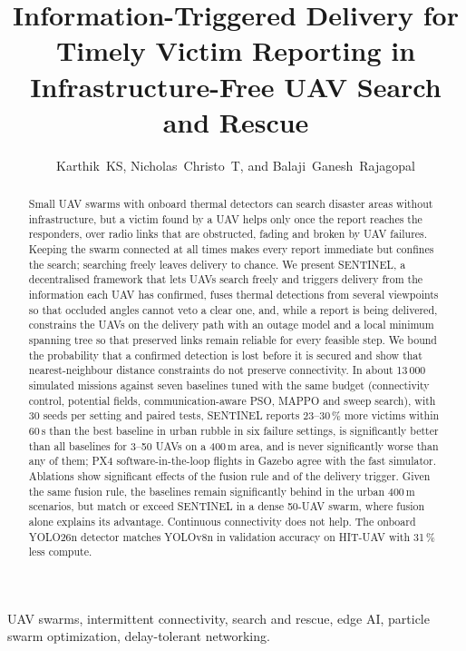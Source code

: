 \documentclass[journal]{IEEEtran}
\theoremstyle{definition}
\begin{document}
\title{Information-Triggered Delivery for Timely Victim Reporting in Infrastructure-Free UAV Search and Rescue}
\author{Karthik~KS, Nicholas~Christo~T, and Balaji~Ganesh~Rajagopal}
\maketitle

\begin{abstract}
Small UAV swarms with onboard thermal detectors can search disaster areas without infrastructure, but
a victim found by a UAV helps only once the report reaches the responders, over radio links that are
obstructed, fading and broken by UAV failures. Keeping the swarm connected at all times makes every
report immediate but confines the search; searching freely leaves delivery to chance. We present
SENTINEL, a decentralised framework that lets UAVs search freely and triggers delivery from the
information each UAV has confirmed, fuses thermal detections from several viewpoints so that occluded
angles cannot veto a clear one, and, while a report is being delivered, constrains the UAVs on the
delivery path with an outage model and a local minimum spanning tree so that preserved links remain
reliable for every feasible step. We bound the probability that a confirmed detection is lost before
it is secured and show that nearest-neighbour distance constraints do not preserve connectivity. In
about 13\,000 simulated missions against seven baselines tuned with the same budget (connectivity
control, potential fields, communication-aware PSO, MAPPO and sweep search), with 30 seeds per
setting and paired tests, SENTINEL reports 23--30\,\% more victims within 60\,s than the best
baseline in urban rubble in six failure settings, is significantly better than all baselines for
3--50 UAVs on a 400\,m area, and is never significantly worse than any of them; PX4 software-in-the-loop flights in
Gazebo agree with the fast simulator. Ablations show significant effects of the fusion rule and
of the delivery trigger. Given the same fusion rule, the baselines remain significantly behind in the
urban 400\,m scenarios, but match or exceed SENTINEL in a dense 50-UAV swarm, where fusion alone
explains its advantage. Continuous connectivity does not help. The onboard YOLO26n
detector matches YOLOv8n in validation accuracy on HIT-UAV with 31\,\% less compute.
\end{abstract}

\begin{IEEEkeywords}
UAV swarms, intermittent connectivity, search and rescue, edge AI, particle swarm optimization, delay-tolerant networking.
\end{IEEEkeywords}












\end{document}

